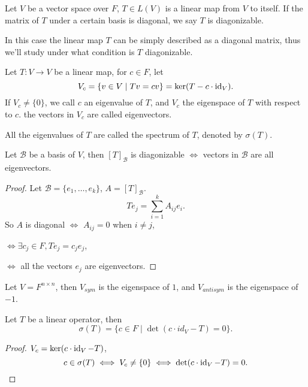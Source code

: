 \begin{definition}
	Let $V$ be a vector space over $F$,
	$T\in L(V)$ is a linear map from $V$ to itself.
	If the matrix of $T$ under a certain basis is diagonal, we say
	$T$ is diagonizable.
\end{definition}

In this case the linear map $T$ can be simply described as a diagonal matrix,
thus we'll study under what condition is $T$ diagonizable.

\begin{definition}[Eigenvalue]
	Let $T: V\to V$ be a linear map, for $c\in F$,
	let
	\[
		V_c= \{v\in V\mid Tv = cv\} = \ker (T- c\cdot \operatorname{id}_V).
	\]
	If $V_c\ne \{0\}$, we call $c$ an eigenvalue of $T$,
	and $V_c$ the eigenspace of $T$ with respect to $c$.
	the vectors in $V_c$ are called eigenvectors.

	All the eigenvalues of $T$ are called the spectrum of $T$, denoted by  $\sigma(T)$.
\end{definition}

\begin{proposition}
	Let $\mathcal{B}$ be a basis of $V$, then  $[T]_{\mathcal{B}}$ is
	diagonizable $\iff$ vectors in $\mathcal{B}$ are all eigenvectors.
\end{proposition}
\begin{proof}[Proof]
	Let $\mathcal{B}=\{e_1,\dots,e_k\}$, $A = [T]_{\mathcal{B}}$.
	\[
	Te_j = \sum_{i=1}^k A_{ij} e_i.
	\]
	So $A$ is diagonal $\iff$ $A_{ij}=0$ when $i\ne j$, 

	$\iff \exists c_j\in F, Te_j = c_j e_j$,

	 $\iff$ all the vectors  $e_j$ are eigenvectors.
\end{proof}
\begin{example}
    Let $V=F^{n\times n}$, then $V_{sym}$ is the eigenspace of $1$,
	and  $V_{antisym}$ is the eigenspace of $-1$.
\end{example}

\begin{lemma}
	Let $T$ be a linear operator, then
	\[
	\sigma(T) = \{c\in F\mid \det (c\cdot id_V - T) = 0\}.
	\]
\end{lemma}
\begin{proof}[Proof]
     $V_c=\ker (c\cdot \operatorname{id}_V - T)$,
	  \[
	 c\in \sigma(T) \iff V_c \ne \{0\} \iff \det(c\cdot \operatorname{id}_V -T) = 0.
	 \]
	 
\end{proof}
